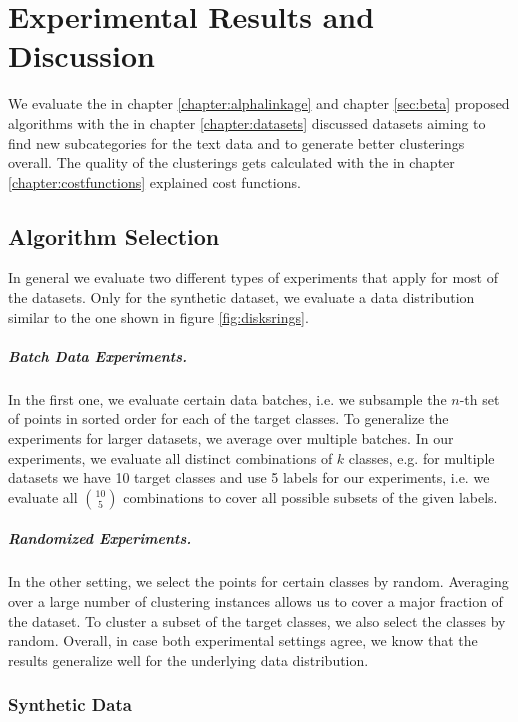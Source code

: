 \chapter{Experimental Results and Discussion}
\label{sec:results}

We evaluate the in chapter \ref{chapter:alphalinkage} and chapter \ref{sec:beta} proposed algorithms with the in chapter \ref{chapter:datasets} discussed datasets aiming to find new subcategories for the text data and to generate better clusterings overall. The quality of the clusterings gets calculated with the in chapter \ref{chapter:costfunctions} explained cost functions.

\section{Algorithm Selection}

In general we evaluate two different types of experiments that apply for most of the datasets. Only for the synthetic dataset, we evaluate a data distribution similar to the one shown in figure \ref{fig:disksrings}.

\paragraph{Batch Data Experiments.} In the first one, we evaluate certain data batches, i.e. we subsample the $n$-th set of points in sorted order for each of the target classes. To generalize the experiments for larger datasets, we average over multiple batches. In our experiments, we evaluate all distinct combinations of $k$ classes, e.g. for multiple datasets we have 10 target classes and use 5 labels for our experiments, i.e. we evaluate all $10 \choose 5$ combinations to cover all possible subsets of the given labels.

\paragraph{Randomized Experiments.} In the other setting, we select the points for certain classes by random. Averaging over a large number of clustering instances allows us to cover a major fraction of the dataset. To cluster a subset of the target classes, we also select the classes by random. Overall, in case both experimental settings agree, we know that the results generalize well for the underlying data distribution.

\subsection{Synthetic Data} 

